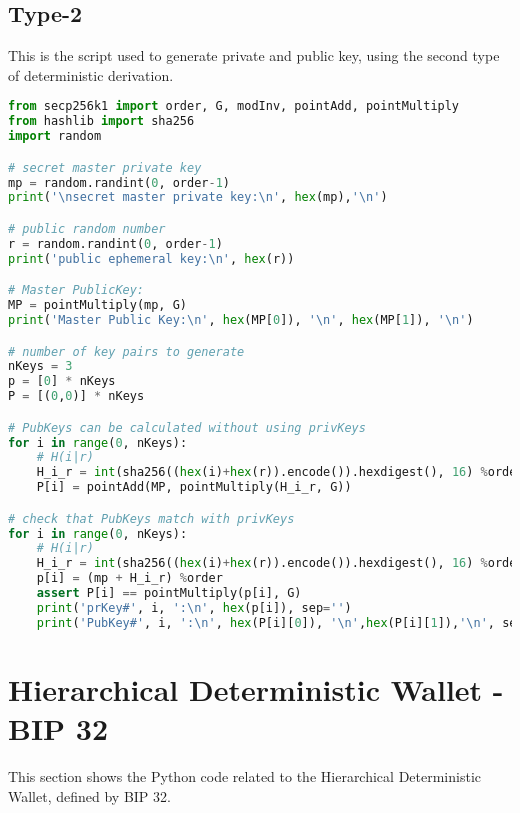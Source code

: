 \subsection{Type-2}
\begin{flushleft}
	This is the script used to generate private and public key, using the second type of deterministic derivation.
\end{flushleft}
\begin{lstlisting}[language=Python]
from secp256k1 import order, G, modInv, pointAdd, pointMultiply
from hashlib import sha256
import random

# secret master private key
mp = random.randint(0, order-1)
print('\nsecret master private key:\n', hex(mp),'\n')

# public random number
r = random.randint(0, order-1)
print('public ephemeral key:\n', hex(r))

# Master PublicKey:
MP = pointMultiply(mp, G)
print('Master Public Key:\n', hex(MP[0]), '\n', hex(MP[1]), '\n')

# number of key pairs to generate
nKeys = 3
p = [0] * nKeys
P = [(0,0)] * nKeys

# PubKeys can be calculated without using privKeys
for i in range(0, nKeys):
	# H(i|r)
	H_i_r = int(sha256((hex(i)+hex(r)).encode()).hexdigest(), 16) %order
	P[i] = pointAdd(MP, pointMultiply(H_i_r, G))                 

# check that PubKeys match with privKeys
for i in range(0, nKeys):
	# H(i|r)
	H_i_r = int(sha256((hex(i)+hex(r)).encode()).hexdigest(), 16) %order
	p[i] = (mp + H_i_r) %order
	assert P[i] == pointMultiply(p[i], G)
	print('prKey#', i, ':\n', hex(p[i]), sep='')
	print('PubKey#', i, ':\n', hex(P[i][0]), '\n',hex(P[i][1]),'\n', sep='')
\end{lstlisting}


\section{Hierarchical Deterministic Wallet - BIP 32}

\begin{flushleft}
	This section shows the Python code related to the Hierarchical Deterministic Wallet, defined by BIP 32.
\end{flushleft}

